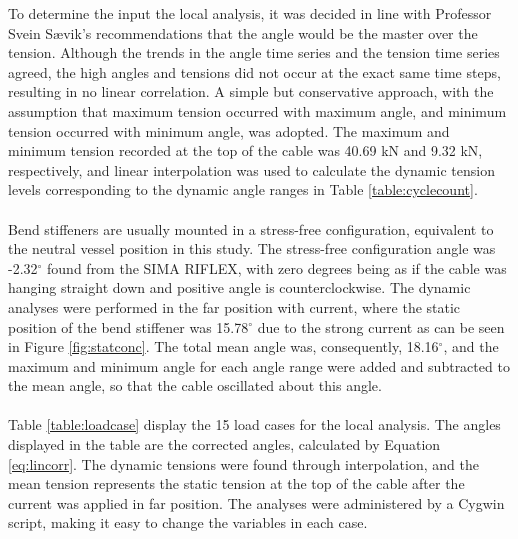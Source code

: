 To determine the input the local analysis, it was decided in line with Professor Svein Sævik's recommendations that the angle would be the master over the tension. Although the trends in the angle time series and the tension time series agreed, the high angles and tensions did not occur at the exact same time steps, resulting in no linear correlation. A simple but conservative approach, with the assumption that maximum tension occurred with maximum angle, and minimum tension occurred with minimum angle, was adopted. The maximum and minimum tension recorded at the top of the cable was 40.69 kN and 9.32 kN, respectively, and linear interpolation was used to calculate the dynamic tension levels corresponding to the dynamic angle ranges in Table \ref{table:cyclecount}. \\\\Bend stiffeners are usually mounted in a stress-free configuration, equivalent to the neutral vessel position in this study. The stress-free configuration angle was -2.32$^\circ$ found from the SIMA RIFLEX, with zero degrees being as if the cable was hanging straight down and positive angle is counterclockwise. The dynamic analyses were performed in the far position with current, where the static position of the bend stiffener was 15.78$^\circ$ due to the strong current as can be seen in Figure \ref{fig:statconc}. The total mean angle was, consequently, 18.16$^\circ$, and the maximum and minimum angle for each angle range were added and subtracted to the mean angle, so that the cable oscillated about this angle.\\\\
Table  \ref{table:loadcase} display the 15 load cases for the local analysis. The angles displayed in the table are the corrected angles, calculated by Equation \ref{eq:lincorr}. The dynamic tensions were found through interpolation, and the mean tension represents the static tension at the top of the cable after the current was applied in far position. The analyses were administered by a Cygwin script, making it easy to change the variables in each case. 
